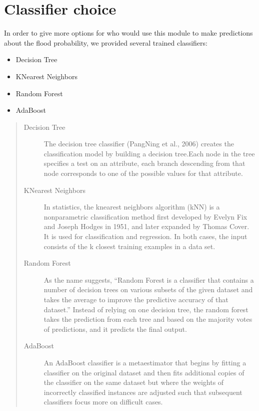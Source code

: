 \documentclass[letterpaper,10pt,english]{sphinxmanual}
\begin{document}
\chapter{Classifier choice}
\label{\detokenize{index:classifier-choice}}
\sphinxAtStartPar
In order to give more options for who would use this module to make predictions about the flood probability, we provided several trained classifiers:
\begin{itemize}
\item {} 
\sphinxAtStartPar
Decision Tree

\item {} 
\sphinxAtStartPar
K\sphinxhyphen{}Nearest Neighbors

\item {} 
\sphinxAtStartPar
Random Forest

\item {} 
\sphinxAtStartPar
AdaBoost

\end{itemize}
\begin{quote}\begin{description}
\item[{Decision Tree}] \leavevmode
\sphinxAtStartPar
The decision tree classifier (Pang\sphinxhyphen{}Ning et al., 2006) creates the classification model by building a decision tree.Each node in the tree specifies a test on an attribute, each branch descending from that node corresponds to one of the possible values for that attribute.

\item[{K\sphinxhyphen{}Nearest Neighbors}] \leavevmode
\sphinxAtStartPar
In statistics, the k\sphinxhyphen{}nearest neighbors algorithm (k\sphinxhyphen{}NN) is a non\sphinxhyphen{}parametric classification method first developed by Evelyn Fix and Joseph Hodges in 1951, and later expanded by Thomas Cover. It is used for classification and regression. In both cases, the input consists of the k closest training examples in a data set.

\item[{Random Forest}] \leavevmode
\sphinxAtStartPar
As the name suggests, “Random Forest is a classifier that contains a number of decision trees on various subsets of the given dataset and takes the average to improve the predictive accuracy of that dataset.” Instead of relying on one decision tree, the random forest takes the prediction from each tree and based on the majority votes of predictions, and it predicts the final output.

\item[{AdaBoost}] \leavevmode
\sphinxAtStartPar
An AdaBoost classifier is a meta\sphinxhyphen{}estimator that begins by fitting a classifier on the original dataset and then fits additional copies of the classifier on the same dataset but where the weights of incorrectly classified instances are adjusted such that subsequent classifiers focus more on difficult cases.

\end{description}\end{quote}
\end{document}
